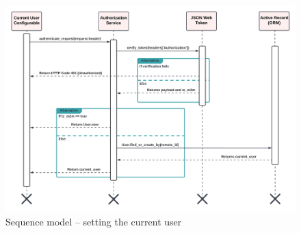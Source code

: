 \begin{justify}
\begin{figure}[H]
    \centerline{\includegraphics[width=150mm,scale=1]{figures/analysis_and_design/design/2. Set Current User.png}}
    \caption{Sequence model -- setting the current user}
    \label{settingCurrentUser}
\end{figure}
\end{justify}
\clearpage


